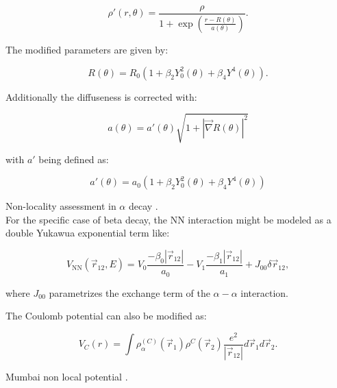 \documentclass[openany]{book}
\begin{document}
 \begin{equation}\label{potential_nonLocal_modifiedWoodsSaxon}
 	\rho'(r, \theta) = \frac{\rho }{1+\exp{\left(\frac{r-R(\theta)}{a(\theta)}\right)}}.
 \end{equation}
 
The modified parameters are given by:

 \begin{equation}\label{potential_nonLocal_modifiedWoodsSaxon_r}
	R(\theta) = R_0(1 + \beta_2 Y^{2}_{0}(\theta) + \beta_4Y^{4}(\theta)).
\end{equation}

Additionally the diffuseness is corrected with:

 \begin{equation}\label{potential_nonLocal_modifiedWoodsSaxon_a}
	a(\theta) = a'(\theta) \sqrt{1 + |\vec \nabla R(\theta)|^2 }
\end{equation}

with $a'$ being defined as:

 \begin{equation}\label{potential_nonLocal_modifiedWoodsSaxon_aprime}
	a'(\theta) = a_0 \left(1 + \beta_2 Y^{2}_{0}(\theta) + \beta_4Y^{4}(\theta)\right)
\end{equation}

Non-locality assessment in $\alpha$ decay \cite{perez_velasquez_kelkar_upadhyay_2019}. \\

For the specific case of beta decay, the NN interaction might be modeled as a double Yukawua exponential term like: 

\begin{equation}\label{potential_nonLocal_M3Y}
	V_{\mathrm{NN}}(\vec r_{12}, E) = V_0 \frac{-\beta_0 |\vec r_{12}|}{a_0} - V_1 \frac{-\beta_1 |\vec r_{12}|}{a_1} + J_{00}\delta{\vec r_{12}},
\end{equation}

where $J_{00}$ parametrizes the exchange term of the $\alpha-\alpha$ interaction.

The Coulomb potential can also be modified as: 

\begin{equation}\label{potential_nonLocal_coulomb}
	V_{C}(r) = \int \rho^{(C)}_\alpha(\vec r_1) \rho^{{C}}(\vec r_2) \frac{e^2}{|\vec r_{12}|} d\vec r_1 d\vec r_2.
\end{equation}


Mumbai non local potential \cite{upadhyay_bhagwat_jain_2017}. \\
\end{document}
